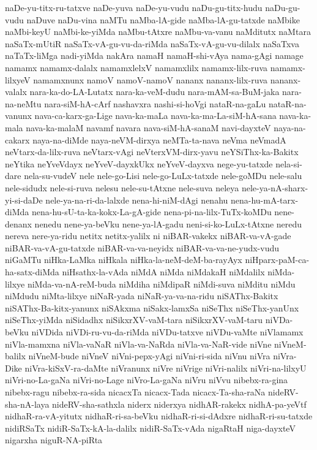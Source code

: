 {naDe-yu-titx-ru-tatxve
naDe-yuva
naDe-yu-vudu
naDu-gu-titx-hudu
naDu-gu-vudu
naDuve
naDu-vina
naMTu
naMba-lA-gide
naMba-lA-gu-tatxde
naMbike
naMbi-keyU
naMbi-ke-yiMda
naMbu-tAtxre
naMbu-va-vanu
naMditutx
naMtara
naSaTx-mUtiR
naSaTx-vA-gu-vu-da-riMda
naSaTx-vA-gu-vu-dilalx
naSaTxva
naTaTx-liMga
nadi-yiMda
nakAra
namaH
namaH-shi-vAya
nama-gAgi
namage
namamx
namamx-dalalx
namamxlelxV
namamxlilx
namamx-lilx-ruva
namamx-lilxyeV
namamxnunx
namoV
namoV-namoV
nananx
nananx-lilx-ruva
nananx-valalx
nara-ka-do-LA-Lutatx
nara-ka-veM-dudu
nara-mAM-sa-BuM-jaka
nara-na-neMtu
nara-siM-hA-cArf
nashavxra
nashi-si-hoVgi
nataR-na-gaLu
nataR-na-vanunx
nava-ca-karx-ga-Lige
nava-ka-maLa
nava-ka-ma-La-siM-hA-sana
nava-ka-mala
nava-ka-malaM
navamf
navara
nava-siM-hA-sanaM
navi-dayxteV
naya-na-cakarx
naya-na-diMde
naya-neVM-dirxya
neMTa-ta-nava
neVma
neVmadA
neVtarx-da-lilx-ruva
neVtarx-vAgi
neVterxVM-dirx-yavu
neYSiThx-ka-Bakitx
neYtika
neYveVdayx
neYveV-dayxkUkx
neYveV-dayxva
nege-yu-tatxde
nela-si-dare
nela-su-vudeV
nele
nele-go-Lisi
nele-go-LuLx-tatxde
nele-goMDu
nele-salu
nele-sidudx
nele-si-ruva
nelesu
nele-su-tAtxne
nele-suva
neleya
nele-ya-nA-sharx-yi-si-daDe
nele-ya-na-ri-da-lalxde
nena-hi-niM-dAgi
nenahu
nena-hu-mA-tarx-diMda
nena-hu-sU-ta-ka-kokx-La-gA-gide
nena-pi-na-lilx-TuTx-koMDu
nene-denanx
nenedu
nene-ya-beVku
nene-ya-lA-gadu
neni-si-ko-LuLx-tAtxne
neredu
nereva
nere-ya-ridu
netitx
netitx-yalilx
ni
niBAR-vakekx
niBAR-va-vA-gade
niBAR-va-vA-gu-tatxde
niBAR-va-va-neyidx
niBAR-va-va-ne-yudx-vudu
niGaMTu
niHka-LaMka
niHkala
niHka-la-neM-deM-ba-rayAyx
niHparx-paM-ca-ha-satx-diMda
niHsathx-la-vAda
niMdA
niMda
niMdakaH
niMdalilx
niMda-lilxye
niMda-va-nA-reM-buda
niMdiha
niMdipaR
niMdi-suva
niMditu
niMdu
niMdudu
niMta-lilxye
niNaR-yada
niNaR-ya-va-na-ridu
niSAThx-Bakitx
niSAThx-Ba-kitx-yanunx
niSAkxma
niSakx-lamxSa
niSeThx
niSeThx-yanUnx
niSeThx-yiMda
niSidadhx
niSikxrXV-vaM-tara
niSikxrXV-vaM-taru
niVDa-beVku
niVDida
niVDi-ru-vu-da-riMda
niVDu-tatxve
niVDu-vaMte
niVlamamx
niVla-mamxna
niVla-vaNaR
niVla-va-NaRda
niVla-va-NaR-vide
niVne
niVneM-balilx
niVneM-bude
niVneV
niVni-pepx-yAgi
niVni-ri-sida
niVnu
niVra
niVra-Dike
niVra-kiSxV-ra-daMte
niVranunx
niVre
niVrige
niVri-nalilx
niVri-na-lilxyU
niVri-no-La-gaNa
niVri-no-Lage
niVro-La-gaNa
niVru
niVvu
nibebx-ra-gina
nibebx-ragu
nibebx-ra-sida
nicacxTa
nicacx-Tada
nicacx-Ta-sha-raNa
nideRV-sha-nA-laya
nideRV-sha-sathxla
niderx
niderxya
nidhAR-rakekx
nidhA-pa-yeVtf
nidhaR-ra-vA-yitutx
nidhaR-ri-sa-beVku
nidhaR-ri-si-dAdxre
nidhaR-ri-su-tatxde
nidiRSaTx
nidiR-SaTx-kA-la-dalilx
nidiR-SaTx-vAda
nigaRtaH
niga-dayxteV
nigarxha
niguR-NA-piRta
}
